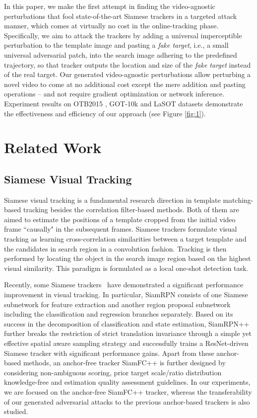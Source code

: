 \documentclass{article}
\newcommand{\ie}{i.e.}
\begin{document}
In this paper, we make the first attempt in finding the video-agnostic perturbations that fool state-of-the-art Siamese trackers in a targeted attack manner, which comes at virtually no cost in the online-tracking phase. Specifically, we aim to attack the trackers by adding a universal imperceptible perturbation to the template image and pasting a \textit{fake target}, \ie, a small universal adversarial patch, into the search image adhering to the predefined trajectory, so that tracker outputs the location and size of the \textit{fake target} instead of the real target. Our generated video-agnostic perturbations allow perturbing a novel video to come at no additional cost except the mere addition and pasting operations -- and not require gradient optimization or network inference. Experiment results on OTB2015 \cite{OTB}, GOT-10k \cite{GOT-10k} and LaSOT \cite{GOT-10k} datasets demonstrate the effectiveness and efficiency of our approach (see Figure \ref{fig:1}).

\section{Related Work}

\subsection{Siamese Visual Tracking}

Siamese visual tracking is a fundamental research direction in template matching-based tracking besides the correlation filter-based methods. Both of them are aimed to estimate the positions of a template cropped from the initial video frame ``causally" in the subsequent frames. Siamese trackers formulate visual tracking as learning cross-correlation similarities between a target template and the candidates in search region in a convolution fashion. Tracking is then performed by locating the object in the search image region based on the highest visual similarity. This paradigm is formulated as a local one-shot detection task.

Recently, some Siamese trackers~\cite{SiamRPN,SiamRPN++,SiamFC++} have demonstrated a significant performance improvement in visual tracking. 
In particular, SiamRPN \cite{SiamRPN} consists of one Siamese subnetwork for feature extraction and another region proposal subnetwork including the classification and regression branches separately. Based on its success in the decomposition of classification and state estimation, SiamRPN++ \cite{SiamRPN++} further breaks the restriction of strict translation invariance through a simple yet effective spatial aware sampling strategy and successfully trains a ResNet-driven Siamese tracker with significant performance gains. Apart from these anchor-based methods, an anchor-free tracker SiamFC++ \cite{SiamFC++} is further designed by considering non-ambiguous scoring, prior target scale/ratio distribution knowledge-free and estimation quality assessment guidelines.
In our experiments, we are focused on the anchor-free SiamFC++ tracker, whereas the transferability of our generated adversarial attacks to the previous anchor-based trackers is also studied.
\end{document}
